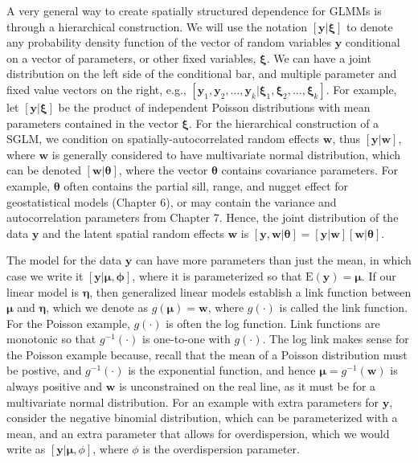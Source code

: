 \documentclass[12pt, titlepage]{article}
\begin{document}
A very general way to create spatially structured dependence for GLMMs is through a hierarchical construction.  We will use the notation $[\mathbf{y}|\boldsymbol{\xi}]$ to denote any probability density function of the vector of random variables $\mathbf{y}$ conditional on a vector of parameters, or other fixed variables, $\boldsymbol{\xi}$. We can have a joint distribution on the left side of the conditional bar, and multiple parameter and fixed value vectors on the right, e.g., $[\mathbf{y}_{1},\mathbf{y}_{2}, \ldots, \mathbf{y}_{k} | \boldsymbol{\xi}_{1}, \boldsymbol{\xi}_{2}, \ldots, \boldsymbol{\xi}_{k}]$. For example, let $[\mathbf{y}|\boldsymbol{\xi}]$ be the product of independent Poisson distributions with mean parameters contained in the vector $\boldsymbol{\xi}$.  For the hierarchical construction of a SGLM, we condition on spatially-autocorrelated random effects $\mathbf{w}$, thus $[\mathbf{y}|\mathbf{w}]$, where $\mathbf{w}$ is generally considered to have multivariate normal distribution, which can be denoted $[\mathbf{w}|\boldsymbol{\theta}]$, where the vector $\boldsymbol{\theta}$ contains covariance parameters.  For example, $\boldsymbol{\theta}$ often contains the partial sill, range, and nugget effect for geostatistical models (Chapter 6), or may contain the variance and autocorrelation parameters from Chapter 7.  Hence, the joint distribution of the data $\mathbf{y}$ and the latent spatial random effects $\mathbf{w}$ is $[\mathbf{y},\mathbf{w}|\boldsymbol{\theta}] = [\mathbf{y}|\mathbf{w}][\mathbf{w}|\boldsymbol{\theta}]$.  

The model for the data $\mathbf{y}$ can have more parameters than just the mean, in which case we write it $[\mathbf{y}|\boldsymbol{\mu},\boldsymbol{\phi}]$, where it is parameterized so that $\textrm{E}(\mathbf{y}) = \boldsymbol{\mu}$.  If our linear model is $\boldsymbol{\eta}$, then generalized linear models establish a link function between $\boldsymbol{\mu}$ and $\boldsymbol{\eta}$, which we denote as $g(\boldsymbol{\mu}) = \mathbf{w}$, where $g(\cdot)$ is called the link function.  For the Poisson example, $g(\cdot)$ is often the log function.  Link functions are monotonic so that $g^{-1}(\cdot)$ is one-to-one with $g(\cdot)$.  The log link makes sense for the Poisson example because, recall that the mean of a Poisson distribution must be postive, and $g^{-1}(\cdot)$ is the exponential function, and hence $\boldsymbol{\mu} = g^{-1}(\mathbf{w})$ is always positive and $\mathbf{w}$ is unconstrained on the real line, as it must be for a multivariate normal distribution. For an example with extra parameters for $\mathbf{y}$, consider the negative binomial distribution, which can be parameterized with a mean, and an extra parameter that allows for overdispersion, which we would write as $[\mathbf{y}|\boldsymbol{\mu},\phi]$, where $\phi$ is the overdispersion parameter.  
\end{document}
